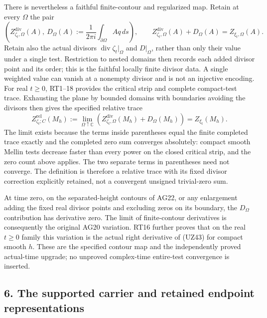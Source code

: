 \documentclass[
  10pt,
  a4paper,
]{article}
\begin{document}
There is nevertheless a faithful finite-contour and regularized map.
Retain at every \(\Omega\) the pair \[
\left(
Z_{\zeta_t,\Omega}^{\mathrm{div}}(A),\
D_\Omega(A):=\frac1{2\pi i}\int_{\partial\Omega}Aq\,ds
\right),\qquad
Z_{\zeta_t,\Omega}^{\mathrm{div}}(A)+D_\Omega(A)=Z_{\xi_t,\Omega}(A).
\tag{UZ42}
\] Retain also the actual divisors \(\operatorname{div}\zeta_t|_\Omega\)
and \(D|_\Omega\), rather than only their value under a single test.
Restriction to nested domains then records each added divisor point and
its order; this is the faithful locally finite divisor data. A single
weighted value can vanish at a nonempty divisor and is not an injective
encoding. For real \(t\ge0\), RT1--18 provides the critical strip and
complete compact-test trace. Exhausting the plane by bounded domains
with boundaries avoiding the divisors then gives the specified relative
trace \[
Z_{\zeta_t;C}^{\mathrm{rel}}(M_h)
:=\lim_{\Omega\uparrow\mathbb C}
\left(Z_{\zeta_t,\Omega}^{\mathrm{div}}(M_h)+D_\Omega(M_h)\right)
=Z_{\xi_t}(M_h).
\tag{UZ43}
\] The limit exists because the terms inside parentheses equal the
finite completed trace exactly and the completed zero sum converges
absolutely: compact smooth Mellin tests decrease faster than every power
on the closed critical strip, and the zero count above applies. The two
separate terms in parentheses need not converge. The definition is
therefore a relative trace with its fixed divisor correction explicitly
retained, not a convergent unsigned trivial-zero sum.

At time zero, on the separated-height contours of AG22, or any
enlargement adding the fixed real divisor points and excluding zeros on
its boundary, the \(D_\Omega\) contribution has derivative zero. The
limit of finite-contour derivatives is consequently the original AG20
variation. RT16 further proves that on the real \(t\ge0\) family this
variation is the actual right derivative of (UZ43) for compact smooth
\(h\). These are the specified contour map and the independently proved
actual-time upgrade; no unproved complex-time entire-test convergence is
inserted.

\subsection{6. The supported carrier and retained endpoint
representations}\label{the-supported-carrier-and-retained-endpoint-representations}
\end{document}
